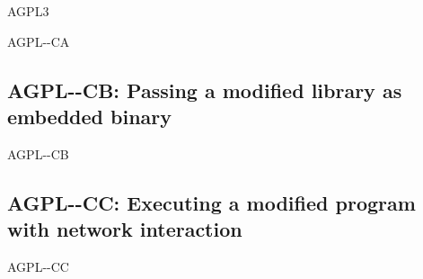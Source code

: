 \begin{license}{AGPL3}
\begin{lsuc}{AGPL-\ver-CA}
  \useCaseA

  \begin{lsucrequires}
    \lsucmandatory{\keepLicenseElements}
    \lsucmandatory{\gplthreeEnsureCopyrightNoticeSource}
    \lsucmandatory{\giveLicense}\passingFilesCorrectly
    \lsucmandatory{\retainCopyrightNotices}
    \lsucmandatory{\addToCopyrightDialogLib}
    \lsucmandatory{\markEmbeddedModifications}
    \lsucmandatory{\arrangeEmbeddedChanges}\howToApplyTheseTerms
    \lsucmandatory{\arrangeEnclosingSources}
    \lsucoptional{\createChangelog}
    \lsucoptional{\addToDocumentation}
  \end{lsucrequires}

  \begin{lsucprohibits}
    \lsucitem{\noPatentLitigation}
  \end{lsucprohibits}
\end{lsuc}

\subsection{AGPL-\ver-CB: Passing a modified library as embedded binary}
\begin{lsuc}{AGPL-\ver-CB}

  \useCaseB

  \begin{lsucrequires}
    \lsucmandatory{\keepLicenseElements}
    \lsucmandatory{\gplthreeEnsureCopyrightNoticeBinary}
    \lsucmandatory{\giveLicense}\passingFilesCorrectly
    \lsucmandatory{\retainCopyrightNotices}
    \lsucmandatory{\makeAllSourcesAvailable}
    \lsucmandatory{\describeHowToGetSource}
    \lsucmandatory{\addToCopyrightDialogLib}
    \lsucmandatory{\markEmbeddedModifications}
    \lsucmandatory{\arrangeEmbeddedChanges}\howToApplyTheseTerms
    \lsucmandatory{\arrangeEnclosingBinaries}
    \lsucoptional{\createChangelog}
    \lsucoptional{\addToDocumentation}
  \end{lsucrequires}

  \begin{lsucprohibits}
    \lsucitem{\noPatentLitigation}
  \end{lsucprohibits}
\end{lsuc}


\subsection{AGPL-\ver-CC: Executing a modified program with network interaction}
\begin{lsuc}{AGPL-\ver-CC}


\end{lsuc}
\end{license}
